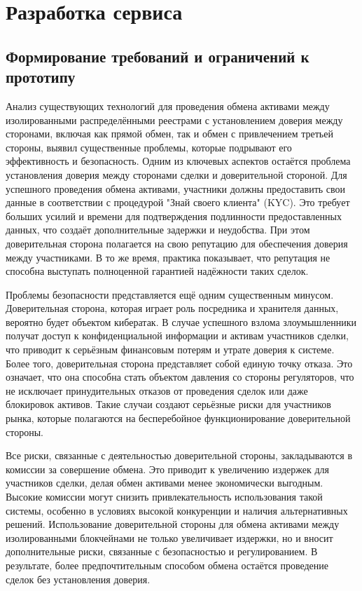 \chapter{Разработка сервиса}

\section{Формирование требований и ограничений к прототипу}

Анализ существующих технологий для проведения обмена активами между изолированными распределёнными реестрами с установлением доверия между сторонами, включая как прямой обмен, так и обмен с привлечением третьей стороны, выявил существенные проблемы, которые подрывают его эффективность и безопасность. Одним из ключевых аспектов остаётся проблема установления доверия между сторонами сделки и доверительной стороной. Для успешного проведения обмена активами, участники должны предоставить свои данные в соответствии с процедурой "Знай своего клиента" (KYC). Это требует больших усилий и времени для подтверждения подлинности предоставленных данных, что создаёт дополнительные задержки и неудобства. При этом доверительная сторона полагается на свою репутацию для обеспечения доверия между участниками. В то же время, практика показывает, что репутация не способна выступать полноценной гарантией надёжности таких сделок.

Проблемы безопасности представляется ещё одним существенным минусом. Доверительная сторона, которая играет роль посредника и хранителя данных, вероятно будет объектом кибератак. В случае успешного взлома злоумышленники получат доступ к конфиденциальной информации и активам участников сделки, что приводит к серьёзным финансовым потерям и утрате доверия к системе. Более того, доверительная сторона представляет собой единую точку отказа. Это означает, что она способна стать объектом давления со стороны регуляторов, что не исключает принудительных отказов от проведения сделок или даже блокировок активов. Такие случаи создают серьёзные риски для участников рынка, которые полагаются на бесперебойное функционирование доверительной стороны.

Все риски, связанные с деятельностью доверительной стороны, закладываются в комиссии за совершение обмена. Это приводит к увеличению издержек для участников сделки, делая обмен активами менее экономически выгодным. Высокие комиссии могут снизить привлекательность использования такой системы, особенно в условиях высокой конкуренции и наличия альтернативных решений. Использование доверительной стороны для обмена активами между изолированными блокчейнами не только увеличивает издержки, но и вносит дополнительные риски, связанные с безопасностью и регулированием. В результате, более предпочтительным способом обмена остаётся проведение сделок без установления доверия.

